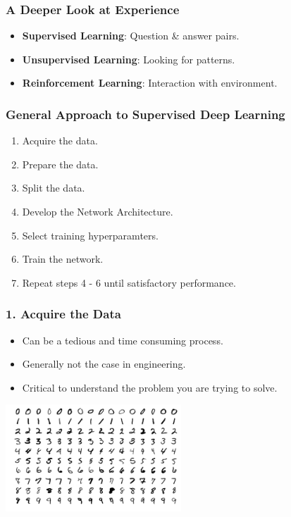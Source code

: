 \documentclass{beamer}
\begin{document}
\begin{frame}

    \frametitle{A Deeper Look at Experience}

    \begin{itemize}
        \item \textbf{Supervised Learning}: Question \& answer pairs.
        \item \textbf{Unsupervised Learning}: Looking for patterns.
        \item \textbf{Reinforcement Learning}: Interaction with environment.
    \end{itemize}


\end{frame}


\begin{frame}

    \frametitle{General Approach to Supervised Deep Learning}

    \begin{enumerate}
        \item Acquire the data.
        \item Prepare the data.
        \item Split the data.
        \item Develop the Network Architecture.
        \item Select training hyperparamters.
        \item Train the network.
        \item Repeat steps 4 - 6 until satisfactory performance.
    \end{enumerate}

\end{frame}

\begin{frame}

    \frametitle{1. Acquire the Data}

    \begin{itemize}
        \item Can be a tedious and time consuming process.
        \item Generally not the case in engineering.
        \item Critical to understand the problem you are trying to solve.
    \end{itemize}

    \begin{center}
        \includegraphics[height=4cm]{figs/mnist_examples.png}
    \end{center}

\end{frame}
\end{document}
